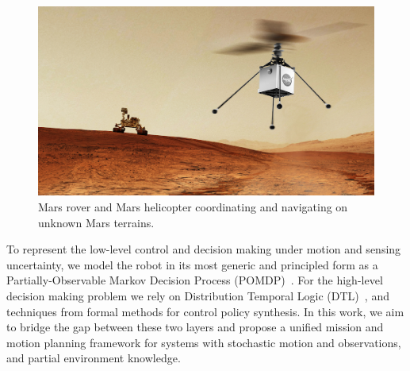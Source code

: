 \documentclass[letterpaper]{article} %
\begin{document}
    
    \begin{figure}[t]
		\centering
		\includegraphics[width=0.75\columnwidth]{figs/heli-rover.png}
		\caption{Mars rover and Mars helicopter coordinating and navigating on unknown Mars terrains.}
		\label{fig:cover}
	\end{figure}
    
    To represent the low-level control and decision making under motion and sensing uncertainty, we model the robot
    in its most generic and principled form as a Partially-Observable Markov Decision Process
    (POMDP)~\cite{Kaelbling98,Smallwood73}.
    For the high-level decision making problem we rely on Distribution Temporal Logic (DTL)~\cite{JonesDTL2013},
    and techniques from formal methods for control policy synthesis.
    In this work, we aim to bridge the gap between these two layers and propose a unified mission and motion planning framework for systems with stochastic motion and observations, and partial environment knowledge.
	
\end{document}
